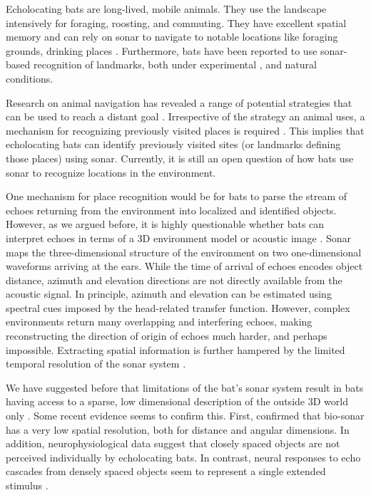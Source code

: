 \documentclass[preprint,5p]{elsarticle}
\begin{document}
Echolocating bats are long-lived, mobile animals. They use the landscape intensively for foraging, roosting, and commuting. They have excellent spatial memory \citep{Barchi2013,VonHelversen2005} and can rely on sonar to navigate to notable locations like foraging grounds, drinking places \citep[see][for references]{Vanderelst2016,Vanderelst2017}. Furthermore, bats have been reported to use sonar-based recognition of landmarks, both under experimental \citep{Jensen2005,Yu2019}, and natural \citep{Verboom1999} conditions.

Research on animal navigation has revealed a range of potential strategies that can be used to reach a distant goal \citep[Reviewed by][]{Franz2000}. Irrespective of the strategy an animal uses, a mechanism for recognizing previously visited places is required \citep{Vanderelst2016,Vanderelst2017}. This implies that echolocating bats can identify previously visited sites (or landmarks defining those places) using sonar. Currently, it is still an open question of how bats use sonar to recognize locations in the environment.

One mechanism for place recognition would be for bats to parse the stream of echoes returning from the environment \cite[e.g.,][]{Yovel2009,Vanderelst2016} into localized and identified objects. However, as we argued before, it is highly questionable whether bats can interpret echoes in terms of a 3D environment model or acoustic image \citep[e.g.,][]{Vanderelst2015,Vanderelst2016,Steckel2013}. Sonar maps the three-dimensional structure of the environment on two one-dimensional waveforms arriving at the ears. While the time of arrival of echoes encodes object distance, azimuth and elevation directions are not directly available from the acoustic signal. In principle, azimuth and elevation can be estimated using spectral cues imposed by the head-related transfer function. However, complex environments return many overlapping and interfering echoes, making reconstructing the direction of origin of echoes much harder, and perhaps impossible. Extracting spatial information is further hampered by the limited temporal resolution of the sonar system \citep{Simmons1989,Wiegrebe1996,Surlykke1996}. 

We have suggested before that limitations of the bat's sonar system result in bats having access to a sparse, low dimensional description of the outside 3D world only \citep{Vanderelst2015a,Vanderelst2016}. Some recent evidence seems to confirm this. First, \citet{Geberl2019} confirmed that bio-sonar has a very low spatial resolution, both for distance and angular dimensions. In addition, neurophysiological data suggest that closely spaced objects are not perceived individually by echolocating bats. In contrast, neural responses to echo cascades from densely spaced objects seem to represent a single extended stimulus \citep{Warnecke2018}. 
\end{document}
